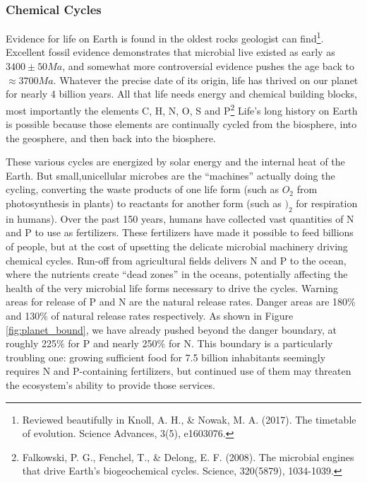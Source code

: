 \subsubsection{Chemical Cycles}
Evidence for life on Earth is found in the oldest rocks geologist can find\footnote{Reviewed beautifully in Knoll, A. H., \& Nowak, M. A. (2017). The timetable of evolution. Science Advances, 3(5), e1603076.}. Excellent fossil evidence demonstrates that microbial live existed as early as $3400\pm 50 Ma$, and somewhat more controversial evidence pushes the age back to $\approx 3700 Ma$. Whatever the precise date of its origin, life has thrived on our planet for nearly 4 billion years. All that life needs energy and chemical building blocks, most importantly the elements C, H, N, O, S and P\footnote{Falkowski, P. G., Fenchel, T., \& Delong, E. F. (2008). The microbial engines that drive Earth's biogeochemical cycles. Science, 320(5879), 1034-1039.} Life's long history on Earth is possible because those elements are continually cycled from the biosphere, into the geosphere, and then back into the biosphere.

These various cycles are energized by solar energy and the internal heat of the Earth. But small,unicellular microbes are the ``machines'' actually doing the cycling, converting the waste products of one life form (such as $O_2$ from photosynthesis in plants) to reactants for another form (such as $)_2$ for respiration in humans). Over the past 150 years, humans have collected vast quantities of N and P to use as fertilizers. These fertilizers have made it possible to feed billions of people, but at the cost of upsetting the delicate microbial machinery driving chemical cycles. Run-off from agricultural fields delivers N and P to the ocean, where the nutrients create ``dead zones'' in the oceans, potentially affecting the health of
the very microbial life forms necessary to drive the cycles. Warning areas for release of P and N are the natural release rates. Danger areas are 180\% and 130\% of natural release rates respectively. As shown in Figure \ref{fig:planet_bound}, we have already pushed beyond the danger boundary, at roughly 225\% for P and  nearly 250\% for N. This boundary is a particularly troubling one: growing sufficient food for 7.5 billion inhabitants seemingly requires N and P-containing fertilizers, but continued use of them may threaten the ecosystem's ability to provide those services.

